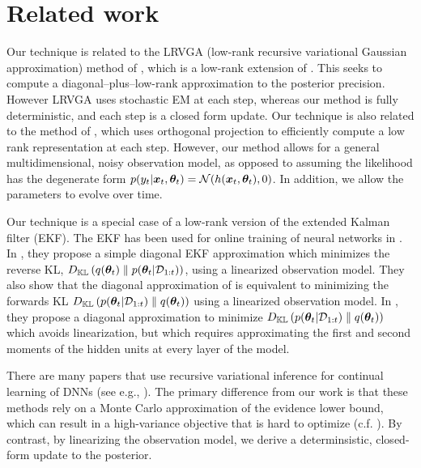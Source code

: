 \section{Related work}
\label{sec:related}





Our technique is related to
the LRVGA (low-rank recursive variational Gaussian approximation) method of \citep{LRVGA},
which is a low-rank extension of \citep{RVGA}.
This seeks to compute a diagonal--plus--low-rank approximation to the posterior precision. 
However LRVGA uses stochastic EM at each step,
whereas our method is fully deterministic,
and each step is a closed form update.
Our technique is also related to 
the \orfit method of \citep{ORFit},
which uses orthogonal projection to efficiently
compute a low rank representation at each step.
However, our method allows
for a general multidimensional, noisy observation model, as opposed to assuming the likelihood has the
degenerate form $p(y_t|{\bm{x}}_t,{\bm{\theta}}_t) =\mathcal{N}(h({\bm{x}}_t,{\bm{\theta}}_t), 0)$.
In  addition, we allow the parameters to evolve over time.

Our technique is a special case of a low-rank version
of the extended Kalman filter (EKF).
The EKF has been used for online training of neural networks
 in \citep{Singhal1988,Watanabe1990,Puskorius1991,Haykin01}.
In \citep{Chang2022},
they propose a simple diagonal EKF approximation
which minimizes the reverse KL,
$D_{\mathbb{KL}}\left({q({\bm{\theta}}_t)} \mathrel{\|} {p({\bm{\theta}}_t|{\mathcal{D}}_{1:t})}\right)$,
using a linearized observation model.
They also show that  the diagonal approximation of 
 \citep{Puskorius1991} is equivalent to minimizing
 the forwards KL
$D_{\mathbb{KL}}\left({p({\bm{\theta}}_t|{\mathcal{D}}_{1:t})} \mathrel{\|} {q({\bm{\theta}}_t)}\right)$
using  a linearized observation model.
In \citep{Ghosh2016,Wagner2022},
they propose  a diagonal approximation
to minimize $D_{\mathbb{KL}}\left({p({\bm{\theta}}_t|{\mathcal{D}}_{1:t})} \mathrel{\|} {q({\bm{\theta}}_t)}\right)$
which avoids linearization, but which requires
approximating the first and second moments of the hidden
units at every layer of the model.

There are many papers that use recursive variational inference for continual learning of DNNs  (see e.g., 
\citep{Nguyen2018continual,Broderick2013,Kurle2020,Zeno2021}).
The primary difference from our work is that these methods rely on a Monte Carlo approximation of the evidence lower bound, which can result in a high-variance objective that is hard to optimize (c.f. \citep{Wu2019VB}).
By contrast, by linearizing the observation model, 
we derive a determinsistic, closed-form update to the posterior.

